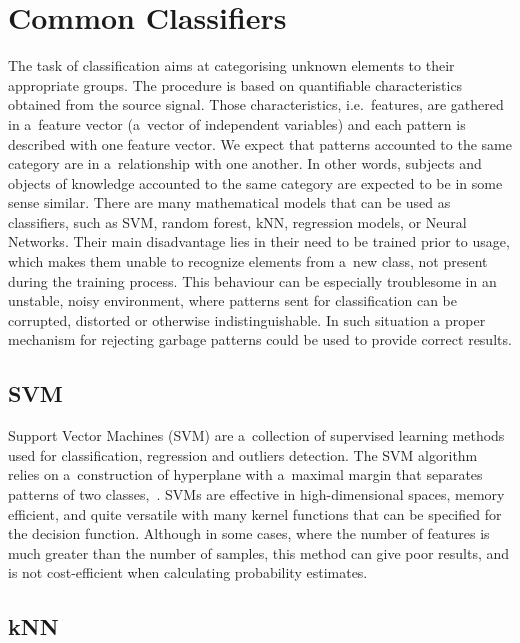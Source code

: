 \chapter{Common Classifiers}
\label{common_classifiers}

The task of classification aims at categorising unknown elements to their appropriate groups. The procedure is based on quantifiable characteristics obtained from the source signal. Those characteristics, i.e.~features, are gathered in a~feature vector (a~vector of independent variables) and each pattern is described with one feature vector. We expect that patterns accounted to the same category are in a~relationship with one another. In other words, subjects and objects of knowledge accounted to the same category are expected to be in some sense similar. There are many mathematical models that can be used as classifiers, such as SVM, random forest, kNN, regression models, or Neural Networks. Their main disadvantage lies in their need to be trained prior to usage, which makes them unable to recognize elements from a~new class, not present during the training process. This behaviour can be especially troublesome in an unstable, noisy environment, where patterns sent for classification can be corrupted, distorted or otherwise indistinguishable. In such situation a proper mechanism for rejecting garbage patterns could be used to provide correct results.

\section{SVM}

Support Vector Machines (SVM) are a~collection of supervised learning methods used for classification, regression and outliers detection. The SVM algorithm relies on a~construction of hyperplane with a~maximal margin that separates patterns of two classes,~\cite{CortesVapnik1995}. SVMs are effective in high-dimensional spaces, memory efficient, and quite versatile with many kernel functions that can be specified for the decision function. Although in some cases, where the number of features is much greater than the number of samples, this method can give poor results, and is not cost-efficient when calculating probability estimates.
\vspace{-3pt}

\section{kNN}

